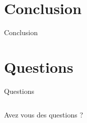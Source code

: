 \documentclass{beamer}
\begin{document}
    \section{Conclusion}
	\begin{frame}{Conclusion}
	    	
	\end{frame}

    \section*{Questions}
	\begin{frame}{Questions}
	    \begin{columns}[c]
		\begin{column}{5cm}
		    Avez vous des questions ?
		\end{column}
    		\begin{column}{5cm}
    		    \begin{figure}
		    \end{figure}
		\end{column}
	    \end{columns}
	\end{frame}
\end{document}
